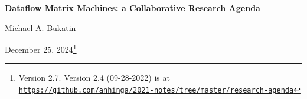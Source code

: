 \documentclass{article}
\begin{document}
\renewcommand{\abstractname}{\vspace{-\baselineskip}}

\renewcommand\contentsname{\vspace{-\baselineskip}}


\begin{center}

{\bf Dataflow Matrix Machines:  a Collaborative Research Agenda}
                                   



\vspace{0.1in}
Michael A. Bukatin


\vspace{0.085in}
December 25, 2024\footnote{Version 2.7. Version 2.4 (09-28-2022) is at
\href{https://github.com/anhinga/2021-notes/tree/master/research-agenda}
{\tt https://github.com/anhinga/2021-notes/tree/master/research-agenda}}

\end{center}
\end{document}
